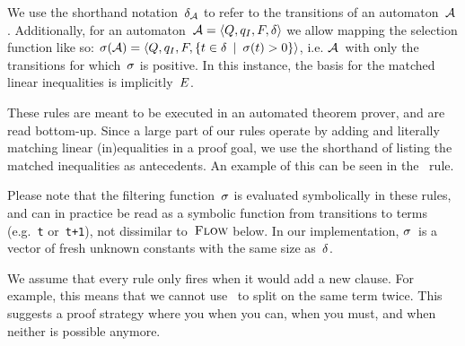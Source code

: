 \documentclass[acmsmall,review,anonymous,screen]{acmart}\settopmatter{printfolios=true,printccs=false,printacmref=true}
\theoremstyle{definition}
\begin{document}
We use the shorthand notation~$\delta_{\mathcal{A}}$ to refer to the
transitions of an automaton~$\mathcal{A}$. Additionally, for an
automaton~$\mathcal{A} = \left\langle Q, q_I, F, \delta\right\rangle$ we allow mapping the selection function
like so: $\operatorname{\sigma}(\mathcal{A}) = \left\langle Q, q_I, F,
\left\{t \in \delta \:\mid\: \operatorname{\sigma}(t) > 0\right\}\right\rangle$, i.e.
$\mathcal{A}$~with only the transitions for which~$\operatorname{\sigma}$ is positive. In this
instance, the basis for the matched linear inequalities is
implicitly~$E$.

These rules are meant to be executed in an automated theorem prover, and are
read bottom-up. Since a large part of our rules operate by adding and literally
matching linear (in)equalities in a proof goal, we use the shorthand of listing
the matched inequalities as antecedents. An example of this can be seen in
the~\Propagate{} rule.

Please note that the filtering function~$\operatorname{\sigma}$ is evaluated symbolically in
these rules, and can in practice be read as a symbolic function from transitions
to terms (e.g.~\texttt{t} or~\texttt{t+1}), not dissimilar to~$\textsc{Flow}$ below.
In our implementation, $\operatorname{\sigma}$~is a vector of fresh unknown constants with the
same size as~$\delta$.

We assume that every rule only fires when it would add a new clause. For
example, this means that we cannot use~\Split{} to split on the same term twice.
This suggests a proof strategy where you \Propagate{} when you can, \Split{}
when you must, and \Subsume{} when neither is possible anymore.
\end{document}
